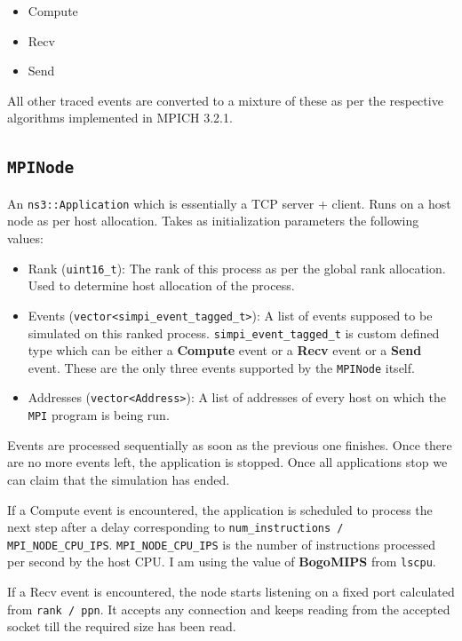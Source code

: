 \documentclass[10pt,conference]{IEEEtran}
\begin{document}
\begin{itemize}
  \item Compute
  \item Recv
  \item Send
\end{itemize}

All other traced events are converted to a mixture of these as per the
respective algorithms implemented in MPICH 3.2.1.

\subsection{\texttt{MPINode}}
An \texttt{ns3::Application} which is essentially a TCP server + client. Runs on
a host node as per host allocation. Takes as initialization parameters the
following values:
\begin{itemize}
  \item Rank (\texttt{uint16\_t}): The rank of this process as per the global
    rank allocation. Used to determine host allocation of the process.
  \item Events (\texttt{vector<simpi\_event\_tagged\_t>}): A list of events
    supposed to be simulated on this ranked process.
    \texttt{simpi\_event\_tagged\_t} is custom defined type which can be either
    a \textbf{Compute} event or a \textbf{Recv} event or a \textbf{Send} event.
    These are the only three events supported by the \texttt{MPINode} itself.
  \item Addresses (\texttt{vector<Address>}): A list of addresses of every host
    on which the \texttt{MPI} program is being run.
\end{itemize}

Events are processed sequentially as soon as the previous one finishes. Once
there are no more events left, the application is stopped. Once all applications
stop we can claim that the simulation has ended.

If a Compute event is encountered, the application is scheduled to process the
next step after a delay corresponding to \texttt{num\_instructions /
  MPI\_NODE\_CPU\_IPS}. \texttt{MPI\_NODE\_CPU\_IPS} is the number of instructions
processed per second by the host CPU. I am using the value of \textbf{BogoMIPS}
from \texttt{lscpu}. 

If a Recv event is encountered, the node starts listening on a fixed port
calculated from \texttt{rank / ppn}. It accepts any connection and keeps
reading from the accepted socket till the required size has been read.
\end{document}
